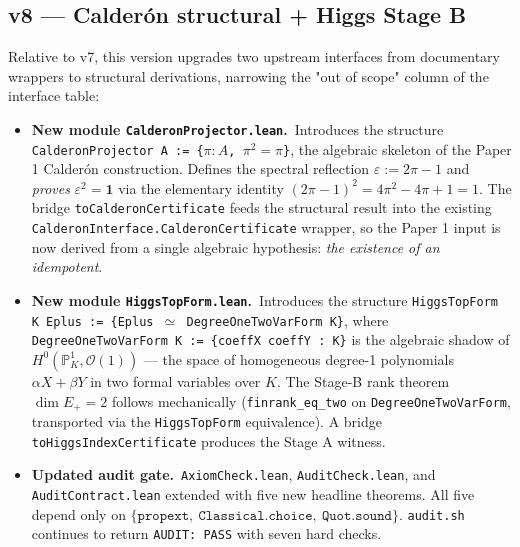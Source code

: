 \subsection*{v8 --- Calderón structural + Higgs Stage B}

Relative to v7, this version upgrades two upstream interfaces
from documentary wrappers to structural derivations, narrowing
the "out of scope" column of the interface table:

\begin{itemize}[leftmargin=1.6em, itemsep=2pt]
\item \textbf{New module \texttt{CalderonProjector.lean}.}\
    Introduces the structure
    \texttt{CalderonProjector A := \{\(\pi : A\), \(\pi^2 = \pi\)\}},
    the algebraic skeleton of the Paper 1 Calder\'on
    construction. Defines the spectral reflection
    $\varepsilon := 2\pi - 1$ and \emph{proves}
    $\varepsilon^2 = \mathbf 1$ via the elementary identity
    $(2\pi - 1)^2 = 4\pi^2 - 4\pi + 1 = 1$. The bridge
    \texttt{toCalderonCertificate} feeds the structural result
    into the existing
    \texttt{CalderonInterface.CalderonCertificate} wrapper, so
    the Paper 1 input is now derived from a single algebraic
    hypothesis: \emph{the existence of an idempotent}.

\item \textbf{New module \texttt{HiggsTopForm.lean}.}\
    Introduces the structure
    \texttt{HiggsTopForm K Eplus :=
            \{Eplus $\simeq$ DegreeOneTwoVarForm K\}},
    where
    \texttt{DegreeOneTwoVarForm K := \{coeffX coeffY : K\}}
    is the algebraic shadow of
    $H^0(\mathbb P^1_K, \mathcal O(1))$ --- the space of
    homogeneous degree-1 polynomials $\alpha X + \beta Y$ in
    two formal variables over $K$. The Stage-B rank theorem
    $\dim E_+ = 2$ follows mechanically (\texttt{finrank\_eq\_two}
    on \texttt{DegreeOneTwoVarForm}, transported via the
    \texttt{HiggsTopForm} equivalence). A bridge
    \texttt{toHiggsIndexCertificate} produces the Stage A
    witness.

\item \textbf{Updated audit gate.}\
    \texttt{AxiomCheck.lean}, \texttt{AuditCheck.lean}, and
    \texttt{AuditContract.lean} extended with five new headline
    theorems. All five depend only on
    $\{\texttt{propext},\ \texttt{Classical.choice},\
    \texttt{Quot.sound}\}$. \texttt{audit.sh} continues to
    return \texttt{AUDIT:\ PASS} with seven hard checks.
\end{itemize}

